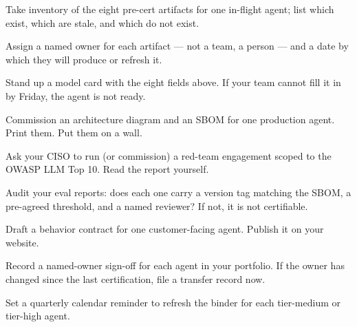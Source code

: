 \begin{TNchecklist}
\item Take inventory of the eight pre-cert artifacts for one in-flight agent; list which exist, which are stale, and which do not exist.
\item Assign a named owner for each artifact --- not a team, a person --- and a date by which they will produce or refresh it.
\item Stand up a model card with the eight fields above. If your team cannot fill it in by Friday, the agent is not ready.
\item Commission an architecture diagram and an SBOM for one production agent. Print them. Put them on a wall.
\item Ask your CISO to run (or commission) a red-team engagement scoped to the OWASP LLM Top 10. Read the report yourself.
\item Audit your eval reports: does each one carry a version tag matching the SBOM, a pre-agreed threshold, and a named reviewer? If not, it is not certifiable.
\item Draft a behavior contract for one customer-facing agent. Publish it on your website.
\item Record a named-owner sign-off for each agent in your portfolio. If the owner has changed since the last certification, file a transfer record now.
\item Set a quarterly calendar reminder to refresh the binder for each tier-medium or tier-high agent.
\end{TNchecklist}



